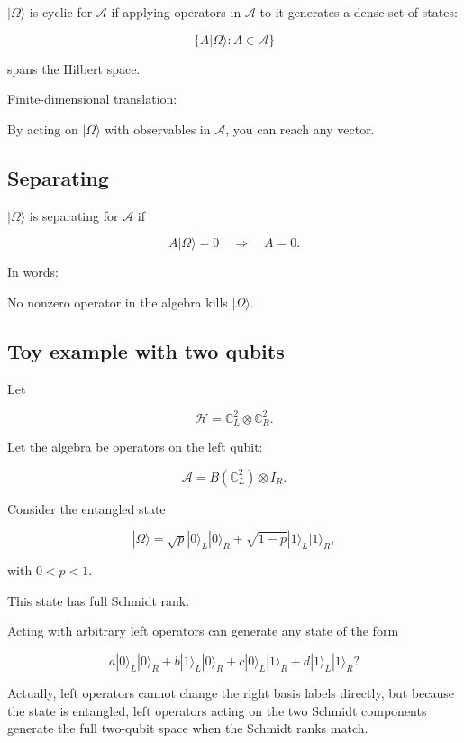 \documentclass[11pt,a4paper]{article}
\newenvironment{qiqtquote}{\begin{mdframed}[style=quotestyle]}{\end{mdframed}}
\begin{document}
$|\Omega\rangle$ is cyclic for $\mathcal{A}$ if applying operators in $\mathcal{A}$ to it generates a dense set of states:

\[
\{A|\Omega\rangle:A\in\mathcal{A}\}
\]

spans the Hilbert space.

Finite-dimensional translation:

\begin{qiqtquote}
By acting on $|\Omega\rangle$ with observables in $\mathcal{A}$, you can reach any vector.
\end{qiqtquote}

\subsection{Separating}

$|\Omega\rangle$ is separating for $\mathcal{A}$ if

\[
A|\Omega\rangle=0
\quad\Rightarrow\quad
A=0.
\]

In words:

\begin{qiqtquote}
No nonzero operator in the algebra kills $|\Omega\rangle$.
\end{qiqtquote}

\subsection{Toy example with two qubits}

Let

\[
\mathcal{H}=\mathbb{C}^2_L\otimes \mathbb{C}^2_R.
\]

Let the algebra be operators on the left qubit:

\[
\mathcal{A}=B(\mathbb{C}^2_L)\otimes I_R.
\]

Consider the entangled state

\[
|\Omega\rangle
=
\sqrt{p}|0\rangle_L|0\rangle_R
+
\sqrt{1-p}|1\rangle_L|1\rangle_R,
\]

with $0<p<1$.

This state has full Schmidt rank.

Acting with arbitrary left operators can generate any state of the form

\[
a|0\rangle_L|0\rangle_R
+
b|1\rangle_L|0\rangle_R
+
c|0\rangle_L|1\rangle_R
+
d|1\rangle_L|1\rangle_R?
\]

Actually, left operators cannot change the right basis labels directly, but because the state is entangled, left operators acting on the two Schmidt components generate the full two-qubit space when the Schmidt ranks match.
\end{document}
